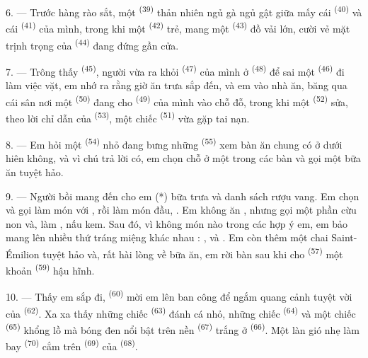 6. --- Trước hàng rào sắt, một  \textsuperscript{(39)} thản
nhiên ngủ gà ngủ gật giữa mấy cái  \textsuperscript{(40)} và cái
 \textsuperscript{(41)} của mình, trong khi một  \textsuperscript{(42)} trẻ, mang một  \textsuperscript{(43)} đồ vải
lớn, cười vẻ mặt trịnh trọng của 
\textsuperscript{(44)} đang đứng gần cửa.

7. --- Trông thấy  \textsuperscript{(45)}, người vừa ra khỏi
 \textsuperscript{(47)} của mình ở  \textsuperscript{(48)}
để sai một  \textsuperscript{(46)} đi làm việc vặt, em nhớ ra rằng
giờ ăn trưa sắp đến, và em vào nhà ăn, băng qua cái sân nơi một 
\textsuperscript{(50)} đang cho  \textsuperscript{(49)} của mình vào chỗ đỗ,
trong khi một  \textsuperscript{(52)} sửa, theo lời chỉ dẫn của
 \textsuperscript{(53)}, một chiếc 
\textsuperscript{(51)} vừa gặp tai nạn.

8. --- Em hỏi một  \textsuperscript{(54)} nhỏ đang bưng những  \textsuperscript{(55)} xem bàn ăn chung có ở dưới hiên không, và vì chú trả lời có,
em chọn chỗ ở một trong các bàn và gọi một bữa ăn tuyệt hảo.


\VUsaut{4.0mm}
\VUsaut{3.0mm}

9. --- Người bồi mang đến cho em  (*) bữa trưa và danh sách rượu vang.
Em chọn và gọi làm  món  với , rồi làm món
đầu, . Em không ăn , nhưng gọi một phần
 cừu non và, làm ,  nấu kem. Sau đó, vì
không món nào trong các  hợp ý em, em bảo mang lên nhiều thứ tráng
miệng khác nhau : ,  và . Em còn thêm
một chai  Saint-Émilion tuyệt hảo và, rất hài lòng về bữa ăn, em rời
bàn sau khi cho  \textsuperscript{(57)} một khoản 
\textsuperscript{(59)} hậu hĩnh.

10. --- Thấy em sắp đi,  \textsuperscript{(60)} mời em lên ban
công để ngắm quang cảnh tuyệt vời của  \textsuperscript{(62)}. Xa xa
thấy những chiếc  \textsuperscript{(63)} đánh cá nhỏ, những chiếc
 \textsuperscript{(64)} và một chiếc 
\textsuperscript{(65)} khổng lồ mà bóng đen nổi bật trên nền 
\textsuperscript{(67)} trắng ở  \textsuperscript{(66)}. Một làn gió nhẹ
làm bay  \textsuperscript{(70)} cắm trên 
\textsuperscript{(69)} của  \textsuperscript{(68)}.


